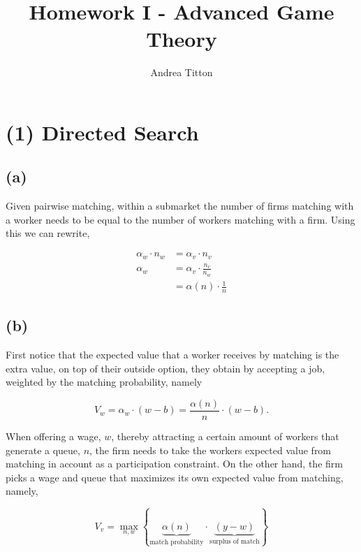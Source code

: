\documentclass[american]{scrartcl}
\title{Homework I - Advanced Game Theory }
\author{Andrea Titton}
\begin{document}

\maketitle

\section*{(1) Directed Search}

\subsection*{(a)}

Given pairwise matching, within a submarket the number of firms matching with a worker needs to be equal to the number of workers matching with a firm. Using this we can rewrite,

\begin{equation}
    \begin{split}
        \alpha_w \cdot n_w &= \alpha_v \cdot n_v \\
        \alpha_w &= \alpha_v \cdot \frac{n_v}{n_w} \\
        &= \alpha(n) \cdot \frac{1}{n}
    \end{split}
\end{equation}

\subsection*{(b)}

First notice that the expected value that a worker receives by matching is the extra value, on top of their outside option, they obtain by accepting a job, weighted by the matching probability, namely

\begin{equation}
    V_w = \alpha_w \cdot (w - b) = \frac{\alpha(n)}{n} \cdot (w - b).
\end{equation}

When offering a wage, $w$, thereby attracting a certain amount of workers that generate a queue, $n$, the firm needs to take the workers expected value from matching in account as a participation constraint. On the other hand, the firm picks a wage and queue that maximizes its own expected value from matching, namely,

\begin{equation} \label{firm_opt}
    V_v = \max_{n, w} \left\{ \underbrace{\alpha(n)}_{\text{match probability}} \cdot \underbrace{(y- w)}_{\text{surplus of match}} \right\}
\end{equation}
\end{document}
